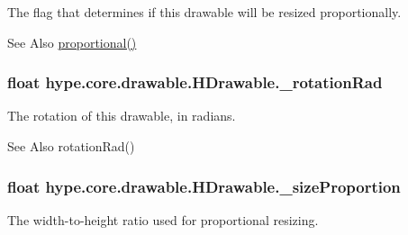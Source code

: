 The flag that determines if this drawable will be resized proportionally. 

\begin{DoxySeeAlso}{See Also}
\hyperlink{classhype_1_1core_1_1drawable_1_1_h_drawable_a220999f7d54e04a47ad0509d349a2bdd}{proportional()} 
\end{DoxySeeAlso}
\hypertarget{classhype_1_1core_1_1drawable_1_1_h_drawable_a5489140987809e738b74139cfa0e7583}{
\subsubsection[{\-\_\-rotation\-Rad}]{\setlength{\rightskip}{0pt plus 5cm}float hype.\-core.\-drawable.\-H\-Drawable.\-\_\-rotation\-Rad\hspace{0.3cm}{\ttfamily [protected]}}}\label{classhype_1_1core_1_1drawable_1_1_h_drawable_a5489140987809e738b74139cfa0e7583}


The rotation of this drawable, in radians. 

\begin{DoxySeeAlso}{See Also}
rotation\-Rad() 
\end{DoxySeeAlso}
\hypertarget{classhype_1_1core_1_1drawable_1_1_h_drawable_a552d888b70c591af96f25c73320f269e}{
\subsubsection[{\-\_\-size\-Proportion}]{\setlength{\rightskip}{0pt plus 5cm}float hype.\-core.\-drawable.\-H\-Drawable.\-\_\-size\-Proportion\hspace{0.3cm}{\ttfamily [protected]}}}\label{classhype_1_1core_1_1drawable_1_1_h_drawable_a552d888b70c591af96f25c73320f269e}


The width-\/to-\/height ratio used for proportional resizing. 

